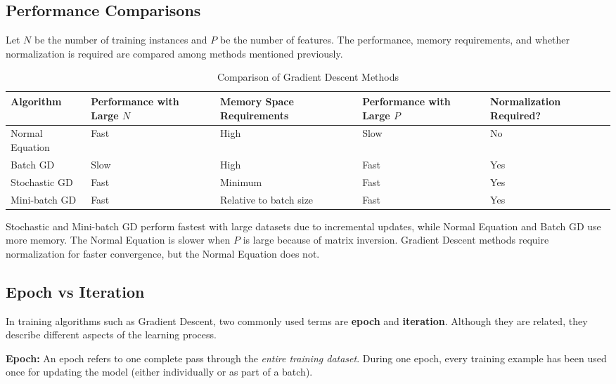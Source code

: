 \documentclass{article}
\begin{document}
\subsection{Performance Comparisons}

Let \(N\) be the number of training instances and \(P\) be the number of features. The performance, memory requirements, and whether normalization is required are compared among methods mentioned previously.

\begin{table}[htbp]
\centering
\scriptsize
\begin{tabularx}{\textwidth}{|>{\centering\arraybackslash}X|
                              >{\centering\arraybackslash}X|
                              >{\centering\arraybackslash}X|
                              >{\centering\arraybackslash}X|
                              >{\centering\arraybackslash}X|}
\hline
\textbf{Algorithm} &
\textbf{Performance with Large $N$} &
\textbf{Memory Space Requirements} &
\textbf{Performance with Large $P$} &
\textbf{Normalization Required?} \\
\hline
Normal Equation & Fast & High & Slow & No \\
Batch GD & Slow & High & Fast & Yes \\
Stochastic GD & Fast & Minimum & Fast & Yes \\
Mini-batch GD & Fast & Relative to batch size & Fast & Yes \\
\hline
\end{tabularx}
\caption{Comparison of Gradient Descent Methods}
\end{table}


Stochastic and Mini-batch GD perform fastest with large datasets due to incremental updates, while Normal Equation and Batch GD use more memory. The Normal Equation is slower when \(P\) is large because of matrix inversion. Gradient Descent methods require normalization for faster convergence, but the Normal Equation does not.


\subsection{Epoch vs Iteration}

In training algorithms such as Gradient Descent, two commonly used terms are \textbf{epoch} and \textbf{iteration}. Although they are related, they describe different aspects of the learning process.

\textbf{Epoch:}  
An epoch refers to one complete pass through the \textit{entire training dataset}. During one epoch, every training example has been used once for updating the model (either individually or as part of a batch).
\end{document}
